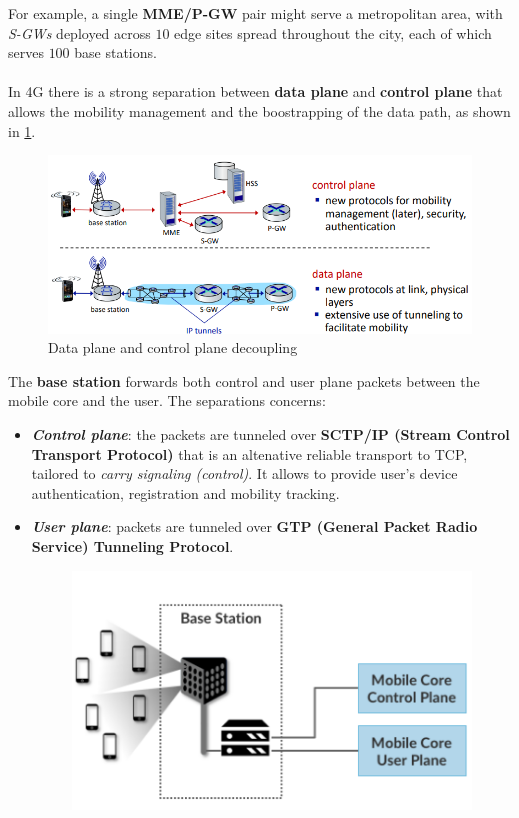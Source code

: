 \documentclass[10pt,a4paper]{report}
\theoremstyle{definition}
\begin{document}
For example, a single \textbf{MME/P-GW} pair might serve a metropolitan area, with \textit{S-GWs} deployed across $10$ edge sites spread throughout the city, each of which serves $100$ base stations.\\\\
In 4G there is a strong separation between \textbf{data plane} and \textbf{control plane} that allows the mobility management and the boostrapping of the data path, as shown in \ref{4g-decoupling}.

\begin{figure}[h]
	\centering\includegraphics[scale=0.50]{images/Pasted image 20230308164601.png}
	\caption{Data plane and control plane decoupling}
	\label{4g-decoupling}
\end{figure}


The \textbf{base station} forwards both control and user plane packets between the mobile core and the user. The separations concerns:
\begin{itemize}
	\item 
	\textit{\textbf{Control plane}}: the packets are tunneled over \textbf{SCTP/IP (Stream Control Transport Protocol)} that is an altenative reliable transport to TCP, tailored to \textit{carry signaling (control)}. It allows to provide user's device authentication, registration and mobility tracking.
	\item 
	\textit{\textbf{User plane}}: packets are tunneled over \textbf{GTP (General Packet Radio Service) Tunneling Protocol}.
	\begin{figure}[h!]
		\centering\includegraphics[scale=0.50]{images/Pasted image 20230309162952.png}
		\caption{}
	\end{figure}
	
\end{itemize}
\end{document}

